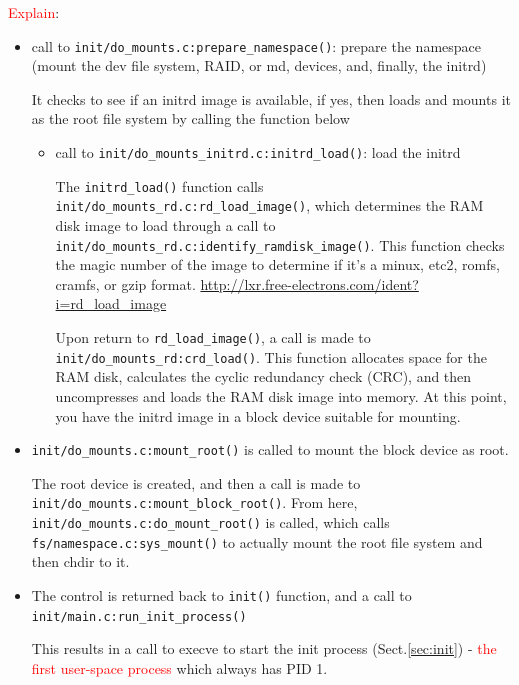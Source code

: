 \textcolor{red}{Explain}:
\begin{itemize}
  \item call to \verb!init/do_mounts.c:prepare_namespace()!: prepare the
  namespace (mount the dev file system, RAID, or md, devices, and, finally, the initrd)

  It checks to see if an initrd image is available, if yes, then loads and
  mounts it as the root file system by calling the function below
  \begin{itemize}
  \item call to \verb!init/do_mounts_initrd.c:initrd_load()!: load the initrd
  
The \verb!initrd_load()! function calls
\verb!init/do_mounts_rd.c:rd_load_image()!, which determines the RAM disk image
to load through a call to \verb!init/do_mounts_rd.c:identify_ramdisk_image()!.
This function checks the magic number of the image to determine if it's a minux,
etc2, romfs, cramfs, or gzip format. 
\url{http://lxr.free-electrons.com/ident?i=rd_load_image}

Upon return to \verb!rd_load_image()!, a call is
made to \verb!init/do_mounts_rd:crd_load()!. This function allocates space for
the RAM disk, calculates the cyclic redundancy check (CRC), and then uncompresses and
loads the RAM disk image into memory. At this point, you have the initrd image
in a block device suitable for mounting.
   \end{itemize}

   \item \verb!init/do_mounts.c:mount_root()! is called to mount the block
   device as root.
   
   The root device is created, and then a call is made to
   \verb!init/do_mounts.c:mount_block_root()!. From here,
   \verb!init/do_mounts.c:do_mount_root()! is called, which calls
   \verb!fs/namespace.c:sys_mount()! to actually mount the root file system and
   then chdir to it. 
   
   \item The control is returned back to \verb!init()! function, and a call to 
   \verb!init/main.c:run_init_process()!
   
   
   This results in a call to execve to start the init process
   (Sect.\ref{sec:init}) - \textcolor{red}{the first user-space process} which
   always has PID 1.
   
  
\end{itemize}



